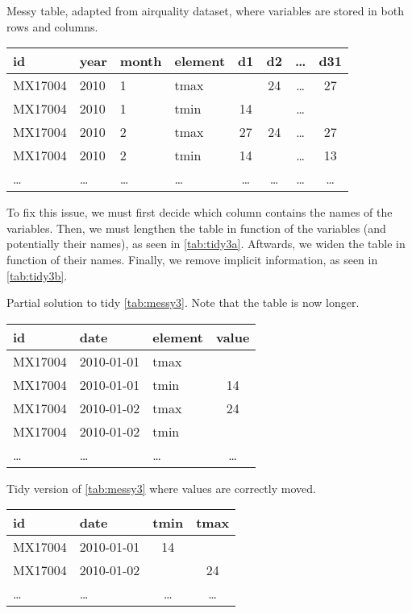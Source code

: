 \begin{tablebox}[label=tab:messy3]{Messy table, adapted from airquality dataset, where variables are stored in both rows and columns.}
  \centering
  \begin{tabular}{llllcccc}
    \toprule
    id & year & month & element & d1 & d2 & \dots & d31 \\
    \midrule
    MX17004 & 2010 & 1 & tmax &    & 24 & \dots & 27 \\
    MX17004 & 2010 & 1 & tmin & 14 &    & \dots &    \\
    MX17004 & 2010 & 2 & tmax & 27 & 24 & \dots & 27 \\
    MX17004 & 2010 & 2 & tmin & 14 &    & \dots & 13 \\
    \dots & \dots & \dots & \dots & \dots & \dots & \dots & \dots \\
    \bottomrule
  \end{tabular}
\end{tablebox}

To fix this issue, we must first decide which column contains the names of the variables.
Then, we must lengthen the table in function of the variables (and potentially their
names), as seen in \cref{tab:tidy3a}.  Aftwards, we widen the table in function of their names.  Finally, we remove
implicit information, as seen in \cref{tab:tidy3b}.

\begin{tablebox}[label=tab:tidy3a]{Partial solution to tidy \cref{tab:messy3}. Note that
  the table is now longer.}
  \centering
  \begin{tabular}{lllc}
    \toprule
    id & date & element & value \\
    \midrule
    MX17004 & 2010-01-01 & tmax &    \\
    MX17004 & 2010-01-01 & tmin & 14 \\
    MX17004 & 2010-01-02 & tmax & 24 \\
    MX17004 & 2010-01-02 & tmin &    \\
    \dots & \dots & \dots & \dots \\
    \bottomrule
  \end{tabular}
\end{tablebox}

\begin{tablebox}[label=tab:tidy3b]{Tidy version of \cref{tab:messy3} where values are correctly moved.}
  \centering
  \begin{tabular}{llcc}
    \toprule
    id & date & tmin & tmax \\
    \midrule
    MX17004 & 2010-01-01 & 14 &    \\
    MX17004 & 2010-01-02 &    & 24 \\
    \dots & \dots & \dots & \dots \\
    \bottomrule
  \end{tabular}
\end{tablebox}

